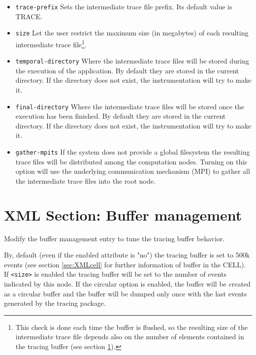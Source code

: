 \begin{itemize}
 \item {\tt trace-prefix} Sets the intermediate trace file prefix. Its default value is {TRACE}.
 \item {\tt size} Let the user restrict the maximum size (in megabytes) of each resulting intermediate trace file\footnote{This check is done each time the buffer is flushed, so the resulting size of the intermediate trace file depends also on the number of elements contained in the tracing buffer (see section \ref{sec:XMLSectionBuffer}).}.
 \item {\tt temporal-directory} Where the intermediate trace files will be stored during the execution of the application. By default they are stored in the current directory. If the directory does not exist, the instrumentation will try to make it.\\
 \item {\tt final-directory} Where the intermediate trace files will be stored once the execution has been finished. By default they are stored in the current directory. If the directory does not exist, the instrumentation will try to make it.\\
 \item {\tt gather-mpits} If the system does not provide a global filesystem the resulting trace files will be distributed among the computation nodes. Turning on this option will use the underlying communication mechanism ({MPI}) to gather all the intermediate trace files into the root node.
\end{itemize}


\section{XML Section: Buffer management}\label{sec:XMLSectionBuffer}

Modify the buffer management entry to tune the tracing buffer behavior.



By, default (even if the enabled attribute is "no") the tracing buffer is set to 500k events (see section \ref{sec:XMLcell} for further information of buffer in the CELL). If {\tt <size>} is enabled the tracing buffer will be set to the number of events indicated by this node. If the circular option is enabled, the buffer will be created as a circular buffer and the buffer will be dumped only once with the last events generated by the tracing package.

